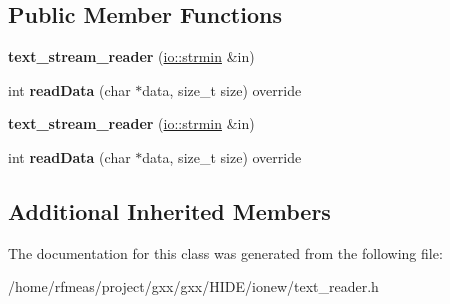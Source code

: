 \subsection*{Public Member Functions}
\begin{DoxyCompactItemize}
\item 
{\bfseries text\+\_\+stream\+\_\+reader} (\hyperlink{classgxx_1_1io_1_1strmin}{io\+::strmin} \&in)\hypertarget{classgxx_1_1io_1_1text__stream__reader_a4f2e101e53ca198626c917d24777dcd3}{}\label{classgxx_1_1io_1_1text__stream__reader_a4f2e101e53ca198626c917d24777dcd3}

\item 
int {\bfseries read\+Data} (char $\ast$data, size\+\_\+t size) override\hypertarget{classgxx_1_1io_1_1text__stream__reader_a3bdcb570d4175e4d035e3f080b252b9a}{}\label{classgxx_1_1io_1_1text__stream__reader_a3bdcb570d4175e4d035e3f080b252b9a}

\item 
{\bfseries text\+\_\+stream\+\_\+reader} (\hyperlink{classgxx_1_1io_1_1strmin}{io\+::strmin} \&in)\hypertarget{classgxx_1_1io_1_1text__stream__reader_a4f2e101e53ca198626c917d24777dcd3}{}\label{classgxx_1_1io_1_1text__stream__reader_a4f2e101e53ca198626c917d24777dcd3}

\item 
int {\bfseries read\+Data} (char $\ast$data, size\+\_\+t size) override\hypertarget{classgxx_1_1io_1_1text__stream__reader_a3bdcb570d4175e4d035e3f080b252b9a}{}\label{classgxx_1_1io_1_1text__stream__reader_a3bdcb570d4175e4d035e3f080b252b9a}

\end{DoxyCompactItemize}
\subsection*{Additional Inherited Members}


The documentation for this class was generated from the following file\+:\begin{DoxyCompactItemize}
\item 
/home/rfmeas/project/gxx/gxx/\+H\+I\+D\+E/ionew/text\+\_\+reader.\+h\end{DoxyCompactItemize}
